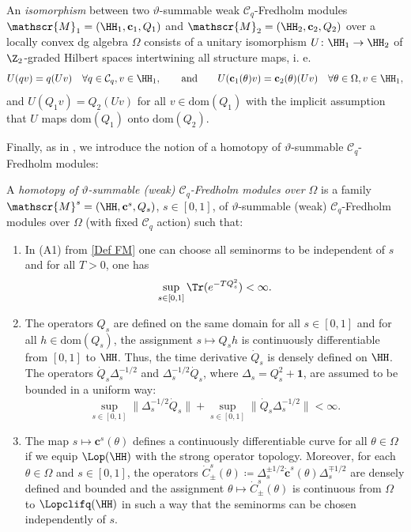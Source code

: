 \documentclass[a4paper, english, 12pt, bibliography=totocnumbered,
index=totoc]{scrartcl}
\begin{document}
\begin{defn}
	An \textit{isomorphism} between two $\vartheta$-summable weak
	$\mathcal{C}_q$-Fredholm modules $\mathscr{M}_1 = (\HH_1, \mathbf{c}_1,
	Q_1)$ and $\mathscr{M}_2 = (\HH_2, \mathbf{c}_2, Q_2)$ over a locally
	convex dg algebra $\Omega$ consists of a unitary
	isomorphism $U \colon \HH_1 \to \HH_2$ of $\Z_2$-graded Hilbert spaces
	intertwining all structure maps, i. e.
	\begin{equation*}
		U(q v) = q (Uv) \quad \forall q \in \mathcal{C}_q, v \in \HH_1,
		\qquad
		\text{and} \qquad U(\mathbf{c}_1(\theta) v) =
		\mathbf{c}_2(\theta)(Uv)
		\quad \forall \theta \in \Omega, v \in \HH_1,
	\end{equation*}
	and $U (Q_1 v) = Q_2 (Uv)$ for all $v \in \mathrm{dom}(Q_1)$ with the
	implicit assumption that $U$ maps $\mathrm{dom}(Q_1)$ onto
	$\mathrm{dom}(Q_2)$.
\end{defn}
Finally, as in \cite[Definition 6.1]{GüneysuLudewig}, we introduce the notion
of a homotopy of $\vartheta$-summable $\mathcal{C}_q$-Fredholm modules:
\begin{defn}\label{Definition homotopy}
	A \textit{homotopy of $\vartheta$-summable (weak) $\mathcal{C}_q$-Fredholm
	modules over $\Omega$} is a family $\mathscr{M}^s = (\HH,
	\mathbf{c}^s,
	Q_s)$, $s \in [0,1]$, of $\vartheta$-summable (weak)
	$\mathcal{C}_q$-Fredholm modules over $\Omega$ (with fixed
	$\mathcal{C}_q$ action) such that:
	\begin{enumerate}
		\item[(H1)] In (A1) from \cref{Def FM} one can choose all seminorms 
		to be independent of $s$ and for all $T>0$, one has
		\begin{equation*}
			\sup_{s\in [0,1]}\Tr(e^{-TQ_s^2})<\infty.
		\end{equation*}
		\item[(H2)] The operators $Q_s$ are defined on the same domain for 
		all $s \in [0,1]$ and for all $h \in \mathrm{dom}(Q_s)$,
		the assignment $s \mapsto Q_s h$ is continuously differentiable from 
		$[0,1]$ to $\HH$.
		Thus, the time derivative $\dot{Q}_s$ is densely defined on $\HH$.
		The operators $\dot{Q}_s\Delta_s^{-1/2}$ and
		$\Delta_s^{-1/2}\dot{Q}_s$, where $\Delta_s 
		= Q_s^2+\mathbf{1}$, are assumed to be bounded in a uniform way:
		\begin{equation*}
			\sup_{s\in [0,1]}\bigl\|\Delta_s^{-1/2}\dot{Q}_s\bigr\| +
			\sup_{s\in
				[0,1]}\bigl\|\dot{Q}_s\Delta_s^{-1/2}\bigr\|<\infty.
		\end{equation*}
		\item[(H3)] The map $s\mapsto
		\mathbf{c}^{s}(\theta)$ defines a continuously differentiable curve 
		for all $\theta\in \Omega$ if we equip $\Lop(\HH)$ with the strong 
		operator topology.
		Moreover, for each $\theta\in \Omega$ and $s \in [0,1]$, the
		operators $\dot{C}^s_\pm(\theta) \coloneqq
		\Delta_s^{\pm1/2}\dot{\mathbf{c}}^s(\theta)\Delta_s^{\mp1/2}$ are
		densely defined and bounded and the assignment $\theta \mapsto
		\dot{C}^s_\pm(\theta)$ is continuous from $\Omega$ to
		$\Lopclifq(\HH)$ in such a way that the seminorms can be chosen
		independently of $s$.
	\end{enumerate}
\end{defn}
\end{document}
